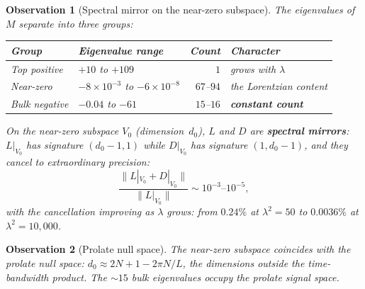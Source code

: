 \documentclass[11pt,a4paper]{article}
\newtheorem{observation}{Observation}[section]
\begin{document}
\begin{observation}[Spectral mirror on the near-zero subspace]\label{obs:mirror}
The eigenvalues of~$M$ separate into three groups:
\begin{center}
\begin{tabular}{llrl}
\toprule
Group & Eigenvalue range & Count & Character \\
\midrule
Top positive & $+10$ to $+109$ & $1$ & grows with $\lambda$ \\
Near-zero & $-8 \times 10^{-3}$ to $-6 \times 10^{-8}$ & $67$--$94$ & the Lorentzian content \\
Bulk negative & $-0.04$ to $-61$ & $15$--$16$ & \textbf{constant count} \\
\bottomrule
\end{tabular}
\end{center}

On the near-zero subspace $V_0$ (dimension~$d_0$), $L$ and $D$ are \textbf{spectral mirrors}: $L|_{V_0}$ has signature $(d_0-1, 1)$ while $D|_{V_0}$ has signature $(1, d_0-1)$, and they cancel to extraordinary precision:
\begin{equation}
\frac{\|L|_{V_0} + D|_{V_0}\|}{\|L|_{V_0}\|} \sim 10^{-3}\text{--}10^{-5},
\end{equation}
with the cancellation \emph{improving} as $\lambda$ grows: from $0.24\%$ at $\lambda^2 = 50$ to $0.0036\%$ at $\lambda^2 = 10{,}000$.
\end{observation}

\begin{observation}[Prolate null space]\label{obs:prolate}
The near-zero subspace coincides with the prolate null space: $d_0 \approx 2N+1 - 2\pi N/L$, the dimensions outside the time-bandwidth product. The $\sim 15$ bulk eigenvalues occupy the prolate \emph{signal} space.
\end{observation}
\end{document}
